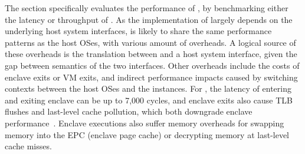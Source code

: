 The section specifically evaluates the performance of \thehostabi{},
by benchmarking 
either the latency or throughput of \hostapis{}.
As the implementation of \hostapis{} largely depends on
the underlying host system interfaces,
\thehostabi{} is likely to share the same performance patterns
as the host OSes,
with various amount of overheads.
A logical source of these overheads
is the translation between \hostapis{}
and a host system interface,
given the gap between semantics of the two interfaces.
Other overheads include the costs of enclave exits or VM exits, and indirect performance impacts
caused by switching contexts between the host OSes and the \libos{} instances.
For \sgx{}, the latency of entering and exiting enclave can be up to \roughly{}7,000 cycles,
and enclave exits also cause TLB flushes and last-level cache pollution, which both downgrade enclave performance~\cite{orenbach17eleos}.
Enclave executions also suffer memory overheads
for swapping memory into the EPC (enclave page cache)
or decrypting memory
at last-level cache misses.


